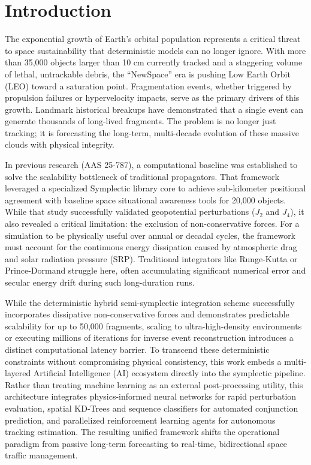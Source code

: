 \documentclass[letterpaper,11pt]{AAS}
\begin{document}
\section{Introduction}
\label{sec:introduction}

The exponential growth of Earth's orbital population represents a critical threat to space sustainability that deterministic models can no longer ignore. With more than 35,000 objects larger than 10 cm currently tracked and a staggering volume of lethal, untrackable debris, the ``NewSpace'' era is pushing Low Earth Orbit (LEO) toward a saturation point. Fragmentation events, whether triggered by propulsion failures or hypervelocity impacts, serve as the primary drivers of this growth. Landmark historical breakups have demonstrated that a single event can generate thousands of long-lived fragments. The problem is no longer just tracking; it is forecasting the long-term, multi-decade evolution of these massive clouds with physical integrity.

In previous research (AAS 25-787), a computational baseline was established to solve the scalability bottleneck of traditional propagators. That framework leveraged a specialized Symplectic library core to achieve sub-kilometer positional agreement with baseline space situational awareness tools for 20,000 objects. While that study successfully validated geopotential perturbations ($J_2$ and $J_4$), it also revealed a critical limitation: the exclusion of non-conservative forces. For a simulation to be physically useful over annual or decadal cycles, the framework must account for the continuous energy dissipation caused by atmospheric drag and solar radiation pressure (SRP). Traditional integrators like Runge-Kutta or Prince-Dormand struggle here, often accumulating significant numerical error and secular energy drift during such long-duration runs.

While the deterministic hybrid semi-symplectic integration scheme successfully incorporates dissipative non-conservative forces and demonstrates predictable scalability for up to 50,000 fragments, scaling to ultra-high-density environments or executing millions of iterations for inverse event reconstruction introduces a distinct computational latency barrier. To transcend these deterministic constraints without compromising physical consistency, this work embeds a multi-layered Artificial Intelligence (AI) ecosystem directly into the symplectic pipeline. Rather than treating machine learning as an external post-processing utility, this architecture integrates physics-informed neural networks for rapid perturbation evaluation, spatial KD-Trees and sequence classifiers for automated conjunction prediction, and parallelized reinforcement learning agents for autonomous tracking estimation. The resulting unified framework shifts the operational paradigm from passive long-term forecasting to real-time, bidirectional space traffic management.
\end{document}
